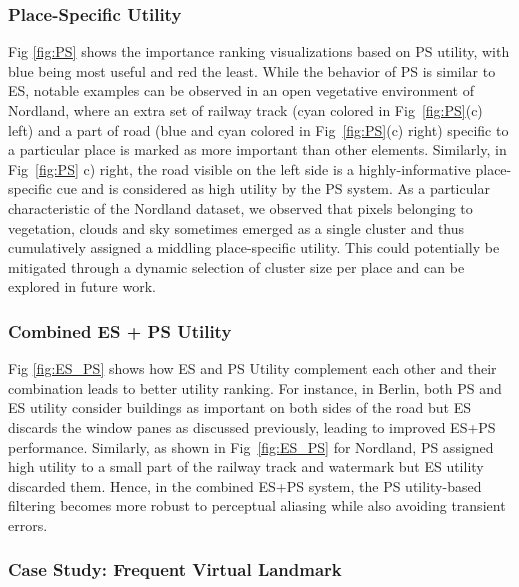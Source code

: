 \documentclass[letterpaper, 10 pt, conference]{ieeeconf}  \fi
\begin{document}
\subsubsection{Place-Specific Utility}
\label{sec:SemPS}
Fig \ref{fig:PS} shows the importance ranking visualizations based on PS utility, with blue being most useful and red the least. While the behavior of PS is similar to ES, notable examples can be observed in an open vegetative environment of Nordland, where an extra set of railway track (cyan colored in Fig~\ref{fig:PS}(c) left) and a part of road (blue and cyan colored in Fig~\ref{fig:PS}(c) right) specific to a particular place is marked as more important than other elements. Similarly, in Fig~\ref{fig:PS} c) right, the road visible on the left side is a highly-informative place-specific cue and is considered as high utility by the PS system. As a particular characteristic of the Nordland dataset, we observed that pixels belonging to vegetation, clouds and sky sometimes emerged as a single cluster and thus cumulatively assigned a middling place-specific utility. This could potentially be mitigated through a dynamic selection of cluster size per place and can be explored in future work.

\subsubsection{Combined ES + PS Utility}
\label{sec:UnifiedQual}

Fig \ref{fig:ES_PS} shows how ES and PS Utility complement each other and their combination leads to better utility ranking. For instance, in Berlin, both PS and ES utility consider buildings as important on both sides of the road but ES discards the window panes as discussed previously, leading to improved ES+PS performance. Similarly, as shown in Fig~\ref{fig:ES_PS} for Nordland, PS assigned high utility to a small part of the railway track and watermark but ES utility discarded them. Hence, in the combined ES+PS system, the PS utility-based filtering becomes more robust to perceptual aliasing while also avoiding transient errors.


\subsubsection{Case Study: Frequent Virtual Landmark}
\label{sec:CaseStudy}
\end{document}
